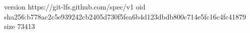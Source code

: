 version https://git-lfs.github.com/spec/v1
oid sha256:b778ac2c5e939242cb2405d730f5fea6b4d123dbdb800c714e5fc16c4fc41879
size 73413

